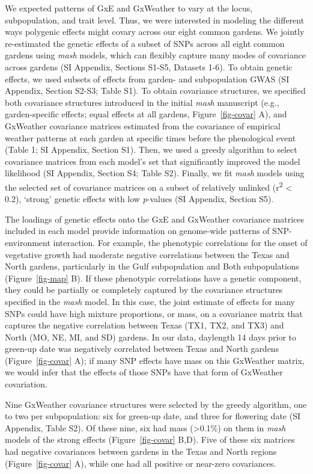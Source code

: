 \documentclass[
  9pt,
  twocolumn,
  twoside]{simple-article}%
\begin{document}
We expected patterns of GxE and GxWeather to vary at the locus,
subpopulation, and trait level. Thus, we were interested in modeling the
different ways polygenic effects might covary across our eight common
gardens\citep{weine2024}. We jointly re-estimated the genetic effects of
a subset of SNPs across all eight common gardens using \emph{mash}
models, which can flexibly capture many modes of covariance across
gardens (SI Appendix, Sections S1-S5, Datasets 1-6). To obtain genetic
effects, we used subsets of effects from garden- and subpopulation GWAS
(SI Appendix, Section S2-S3; Table S1). To obtain covariance structures,
we specified both covariance structures introduced in the initial
\emph{mash} manuscript (e.g., garden-specific effects; equal effects at
all gardens, Figure~\ref{fig-covar} A), and GxWeather covariance
matrices estimated from the covariance of empirical weather patterns at
each garden at specific times before the phenological event (Table 1; SI
Appendix, Section S1). Then, we used a greedy algorithm to select
covariance matrices from each model's set that significantly improved
the model likelihood (SI Appendix, Section S4; Table S2). Finally, we
fit \emph{mash} models using the selected set of covariance matrices on
a subset of relatively unlinked (r\textsuperscript{2} \textless{} 0.2),
`strong' genetic effects with low \emph{p}-values (SI Appendix, Section
S5).

The loadings of genetic effects onto the GxE and GxWeather covariance
matrices included in each model provide information on genome-wide
patterns of SNP-environment interaction. For example, the phenotypic
correlations for the onset of vegetative growth had moderate negative
correlations between the Texas and North gardens, particularly in the
Gulf subpopulation and Both subpopulations (Figure~\ref{fig-map} B). If
these phenotypic correlations have a genetic component, they could be
partially or completely captured by the covariance structures specified
in the \emph{mash} model. In this case, the joint estimate of effects
for many SNPs could have high mixture proportions, or mass, on a
covariance matrix that captures the negative correlation between Texas
(TX1, TX2, and TX3) and North (MO, NE, MI, and SD) gardens. In our data,
daylength 14 days prior to green-up date was negatively correlated
between Texas and North gardens (Figure~\ref{fig-covar} A); if many SNP
effects have mass on this GxWeather matrix, we would infer that the
effects of those SNPs have that form of GxWeather covariation.

Nine GxWeather covariance structures were selected by the greedy
algorithm, one to two per subpopulation: six for green-up date, and
three for flowering date (SI Appendix, Table S2). Of these nine, six had
mass (\textgreater0.1\%) on them in \emph{mash} models of the strong
effects (Figure~\ref{fig-covar} B,D). Five of these six matrices had
negative covariances between gardens in the Texas and North regions
(Figure~\ref{fig-covar} A), while one had all positive or near-zero
covariances.
\end{document}
